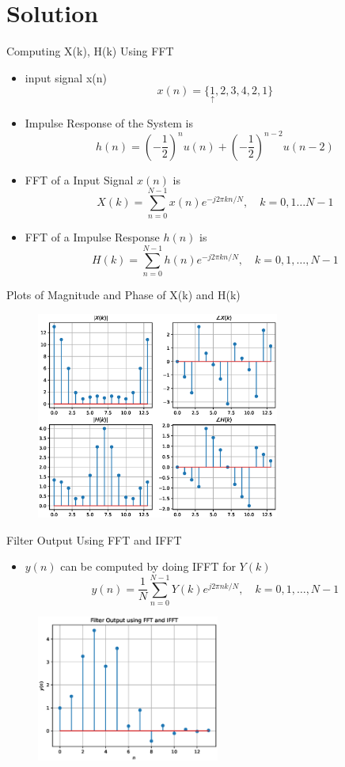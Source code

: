 \documentclass{beamer}
\begin{document}
\section{Solution }
\begin{frame}{Computing X(k), H(k) Using  FFT   }
 
\begin{itemize}
\item input signal x(n)
    \[ x(n) = \{ \underset{\uparrow}{1},2,3,4,2,1 \}\]
    \item Impulse Response of the System is
    \[h(n)=\left(-\frac{1}{2}\right)^{n} u(n)+\left(-\frac{1}{2}\right)^{n-2} u(n-2)\]
    \item FFT of a Input Signal $x(n)$ is 
     \[  X(k) = \sum_{n=0}^{N-1} x(n) e^{-j 2 \pi k n / N}, \quad k=0,1 \ldots N-1\]
    \item FFT of a Impulse Response $h(n)$ is 
    \[  H(k) = \sum_{n=0}^{N-1} h(n) e^{-j 2 \pi k n / N}, \quad k=0,1, \ldots, N-1\]
\end{itemize}

\end{frame} 
\begin{frame}{Plots of Magnitude and Phase of  X(k) and H(k) }
\begin{figure}
    \centering
    \includegraphics[width=8cm]{figs/XH_fft.eps}
\end{figure}

\end{frame} 
\begin{frame}{Filter Output Using FFT and IFFT}
\begin{itemize}
    \item $y(n)$ can be computed by doing IFFT for $Y(k)$
    \[y(n) = \frac{1}{N}\sum_{n=0}^{N-1}Y(k) e^{j 2 \pi n k / N}, \quad k=0,1, \ldots, N-1\]
\end{itemize}
\begin{figure}
    \centering
    \includegraphics[width=6cm]{figs/y_n.eps}
\end{figure}
\end{frame}
\end{document}

